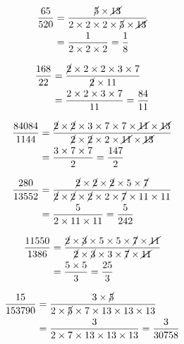 {{\item\begin{align*}
    \dfrac{65}{520} &=
    \dfrac{\cancel{5} \times \cancel{13}}
    {2 \times 2 \times 2 \times \cancel{5} \times \cancel{13}}\\ &=
    \dfrac{1}
    {2 \times 2 \times 2} =
    \dfrac{1}{8}
    \end{align*}

\item\begin{align*}
    \dfrac{168}{22} &=
    \dfrac{\cancel{2} \times 2 \times 2 \times 3 \times 7}
    {\cancel{2} \times 11}\\ &=
    \dfrac{2 \times 2 \times 3 \times 7}
    {11} =
    \dfrac{84}{11}
    \end{align*}

\item\begin{align*}
    \dfrac{84084}{1144} &=
    \dfrac{\cancel{2} \times \cancel{2} \times 3 \times 7 \times 7 \times \cancel{11} \times \cancel{13}}
    {\cancel{2} \times \cancel{2} \times 2 \times \cancel{11} \times \cancel{13}}\\ &=
    \dfrac{3 \times 7 \times 7}
    {2} =
    \dfrac{147}{2}
    \end{align*}

\item\begin{align*}
    \dfrac{280}{13552} &=
    \dfrac{\cancel{2} \times \cancel{2} \times \cancel{2} \times 5 \times \cancel{7}}
    {\cancel{2} \times \cancel{2} \times \cancel{2} \times 2 \times \cancel{7} \times 11 \times 11}\\ &=
    \dfrac{5}
    {2 \times 11 \times 11} =
    \dfrac{5}{242}
    \end{align*}

\item\begin{align*}
    \dfrac{11550}{1386} &=
    \dfrac{\cancel{2} \times \cancel{3} \times 5 \times 5 \times \cancel{7} \times \cancel{11}}
    {\cancel{2} \times \cancel{3} \times 3 \times \cancel{7} \times \cancel{11}}\\ &=
    \dfrac{5 \times 5}
    {3} =
    \dfrac{25}{3}
    \end{align*}

\item\begin{align*}
    \dfrac{15}{153790} &=
    \dfrac{3 \times \cancel{5}}
    {2 \times \cancel{5} \times 7 \times 13 \times 13 \times 13}\\ &=
    \dfrac{3}
    {2 \times 7 \times 13 \times 13 \times 13} =
    \dfrac{3}{30758}
    \end{align*}

}}
